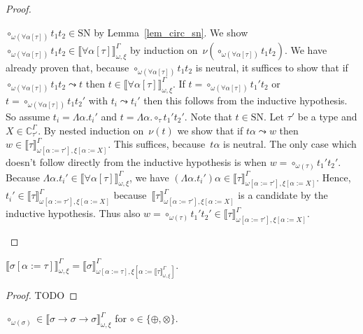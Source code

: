 \documentclass[runningheads,a4paper]{llncs}
\newcommand{\subst}[2]{#1:=#2}
\newcommand{\SN}{\mathrm{SN}}
\newcommand{\Cb}{\mathbb{C}}
\newcommand{\val}[3]{\ensuremath{\llbracket#1\rrbracket_{#2}^{#3}}}
\begin{document}
\begin{proof}
\begin{enumerate}
    $\circ_{\omega(\forall\alpha[\tau])} t_1 t_2 \in \SN$ by
    Lemma~\ref{lem_circ_sn}. We show
    $\circ_{\omega(\forall\alpha[\tau])} t_1 t_2 \in
    \val{\forall\alpha[\tau]}{\omega,\xi}{\Gamma}$ by induction
    on~$\nu(\circ_{\omega(\forall\alpha[\tau])} t_1 t_2)$. We have
    already proven that, because
    $\circ_{\omega(\forall\alpha[\tau])} t_1 t_2$ is neutral, it
    suffices to show that if
    $\circ_{\omega(\forall\alpha[\tau])} t_1 t_2 \leadsto t$ then
    $t \in \val{\forall\alpha[\tau]}{\omega,\xi}{\Gamma}$. If
    $t = \circ_{\omega(\forall\alpha[\tau])} t_1' t_2$ or
    $t = \circ_{\omega(\forall\alpha[\tau])} t_1 t_2'$ with
    $t_i \leadsto t_i'$ then this follows from the inductive
    hypothesis. So assume $t_i = \Lambda\alpha . t_i'$ and
    $t = \Lambda \alpha . \circ_{\tau} t_1' t_2'$. Note that
    $t \in \SN$. Let $\tau'$ be a type and $X \in
    \Cb_{\tau'}^\Gamma$. By nested induction on~$\nu(t)$ we show that
    if $t \alpha \leadsto w$ then
    $w \in
    \val{\tau}{\omega[\subst{\alpha}{\tau'}],\xi[\subst{\alpha}{X}]}{\Gamma}$. This
    suffices, because~$t \alpha$ is neutral. The only case which
    doesn't follow directly from the inductive hypothesis is when
    $w = \circ_{\omega(\tau)} t_1' t_2'$. Because
    $\Lambda \alpha . t_i' \in
    \val{\forall\alpha[\tau]}{\omega,\xi}{\Gamma}$, we have
    $(\Lambda \alpha . t_i') \alpha \in
    \val{\tau}{\omega[\subst{\alpha}{\tau'}],\xi[\subst{\alpha}{X}]}{\Gamma}$. Hence,
    $t_i' \in
    \val{\tau}{\omega[\subst{\alpha}{\tau'}],\xi[\subst{\alpha}{X}]}{\Gamma}$
    because~$\val{\tau}{\omega[\subst{\alpha}{\tau'}],\xi[\subst{\alpha}{X}]}{\Gamma}$
    is a candidate by the inductive hypothesis. Thus also
    $w = \circ_{\omega(\tau)} t_1' t_2' \in
    \val{\tau}{\omega[\subst{\alpha}{\tau'}],\xi[\subst{\alpha}{X}]}{\Gamma}$.
  \end{enumerate}
\end{proof}

\begin{lemma}\label{lem_val_subst}
  $\val{\sigma[\subst{\alpha}{\tau}]}{\omega,\xi}{\Gamma} =
  \val{\sigma}{\omega[\subst{\alpha}{\tau}],\xi[\subst{\alpha}{\val{\tau}{\omega,\xi}{\Gamma}}]}{\Gamma}$.
\end{lemma}

\begin{proof}
  TODO
\end{proof}

\begin{lemma}
  $\circ_{\omega(\sigma)} \in \val{\sigma \to \sigma \to
    \sigma}{\omega,\xi}{\Gamma}$ for
  $\circ \in \{ \oplus, \otimes \}$.
\end{lemma}
\end{document}
